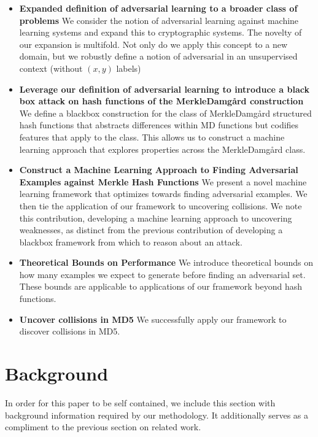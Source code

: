 \documentclass[letterpaper,twocolumn,10pt]{article}
\begin{document}
\begin{itemize}
\item \textbf{Expanded definition of adversarial learning to a broader class of problems} We consider the notion of adversarial learning against machine learning systems and expand this to cryptographic systems. The novelty of our expansion is multifold. Not only do we apply this concept to a new domain, but we robustly define a notion of adversarial in an unsupervised context (without $(x,y)$ labels) 
\item \textbf{Leverage our definition of adversarial learning to introduce a black box attack on hash functions of the Merkle{\textendash}Damg\r{a}rd construction} We define a blackbox construction for the class of Merkle{\textendash}Damg\r{a}rd structured hash functions that abstracts differences within MD functions but codifies features that apply to the class. This allows us to construct a machine learning approach that explores properties across the Merkle{\textendash}Damg\r{a}rd class. 
\item \textbf{Construct a Machine Learning Approach to Finding Adversarial Examples against Merkle Hash Functions} We present a novel machine learning framework that optimizes towards finding adversarial examples. We then tie the application of our framework to uncovering collisions. We note this contribution, developing a machine learning approach to uncovering weaknesses, as distinct from the previous contribution of developing a blackbox framework from which to reason about an attack.
\item \textbf{Theoretical Bounds on Performance} We introduce theoretical bounds on how many examples we expect to generate before finding an adversarial set. These bounds are applicable to applications of our framework beyond hash functions. 
\item \textbf{Uncover collisions in MD5} We successfully apply our framework to discover collisions in MD5. 
\end{itemize}

\section{Background}
In order for this paper to be self contained, we include this section with background information required by our methodology. It additionally serves as a compliment to the previous section on related work.
\end{document}
